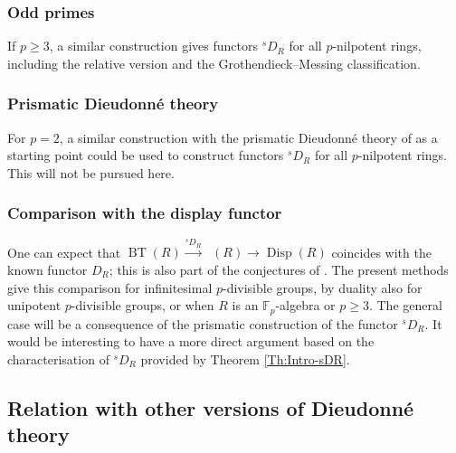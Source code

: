 \documentclass[a4paper,11pt]{amsart}
\theoremstyle{plain}
\theoremstyle{definition}
\theoremstyle{remark}
\numberwithin{equation}{section}
\newcommand{\FF}{{\mathbb{F}}}
\DeclareMathOperator{\BT}{BT}
\DeclareMathOperator{\Disp}{Disp}
\DeclareMathOperator{\sDisp}{{}^sDisp}
\newcommand{\sD}{{}^{s\!}D}
\begin{document}
\subsubsection*{Odd primes}

If $p\ge 3$, a similar construction gives functors $\sD_R$ for all $p$-nilpotent rings, including the relative version and the Grothendieck--Messing classification.

\subsubsection*{Prismatic Dieudonn\'e theory}

For $p=2$, a similar construction with the prismatic Dieudonn\'e theory of \cite{Anschuetz-LeBras} as a starting point could be used to construct functors $\sD_R$ for all $p$-nilpotent rings. This will not be pursued here.

\subsubsection*{Comparison with the display functor}

One can expect that $\BT(R)\xrightarrow{\sD_R}\sDisp(R)\to\Disp(R)$ coincides with the known functor $D_R$; this is also part of the conjectures of \cite{Drinfeld:Talk-Manin}. The present methods give this comparison for infinitesimal $p$-divisible groups, by duality also for unipotent $p$-divisible groups, or when $R$ is an $\FF_p$-algebra or $p\ge 3$. The general case will be a consequence of the prismatic construction of the functor $\sD_R$. It would be interesting to have a more direct argument based on the characterisation of $\sD_R$ provided by Theorem \ref{Th:Intro-sDR}.

\subsection{Relation with other versions of Dieudonn\'e theory}
\end{document}

